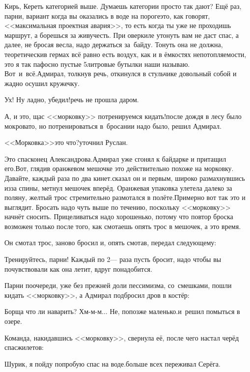 \diagdash Кирь, Кереть категорией выше. Думаешь категории просто так дают? Ещё раз, парни, вариант когда вы оказались в воде на пороге\mdash это, как говорят, <<максимальная проектная авария>>, то есть когда ты уже не проходишь маршрут, а борешься за живучесть. При оверкиле утонуть вам не даст спас, а далее, не бросая весла, надо держаться за~байду. Тонуть она не должна, теоретически\mdash в гермах всё равно есть воздух, как и в ёмкостях непотопляемости, это я так пафосно пустые 5\sdash литровые бутылки наши называю. Вот~и~всё.\mdash Адмирал, толкнув речь, откинулся в стульчике довольный собой и жадно осушил кружечку.

\diagdash Ух! Ну ладно, убедил!\mdash речь не прошла даром.

\diagdash А, и это, щас <<морковку>> потренируемся кидать!\mdash после дождя в лесу было мокровато, но потренироваться в~бросании надо было, решил Адмирал.

\diagdash <<Морковка>>\mdash это что?\mdash уточнил Руслан.

\diagdash Это спасконец Александрова.\mdash Адмирал уже сгонял к байдарке и притащил его.\mdash Вот, гляди\mdash в оранжевом мешочке это действительно похоже на морковку. Давайте, каждый раза по два кинет.\mdash сказал он и первым, широко размахнувшись из\sdash за спины, метнул мешочек вперёд. Оранжевая упаковка улетела далеко за поляну, желтый трос стремительно размотался в полёте.\mdash Примерно вот так это и выглядит. Бросать надо чуть выше по течению, поскольку <<морковку>> начнёт сносить. Прицеливаться надо хорошенько, потому что повтор броска возможен только после того, как смотаешь опять трос в мешочек, а это время.

Он смотал трос, заново бросил и, опять смотав, передал следующему:

\diagdash Тренируйтесь, парни! Каждый по 2\thinspace\nobreakdash--- раза пусть бросит, надо чтобы вы почувствовали как она летит, вдруг понадобится.

Парни по\sdash очереди, уже без прежней доли пессимизма, со~смешками, пошли кидать <<морковку>>, а Адмирал подбросил дров в костёр:

\diagdash Борща что ли наварить? Хм-м-м$\ldots$ Не, попозже маленько.\mdash и~решил помыться в озере.

Команда, накидавшись <<морковку>>, свернула её, после чего настал черёд спасжилетов:

\diagdash Шурик, я пойду попробую спас на воде.\mdash больше всех переживал Серёга. 

